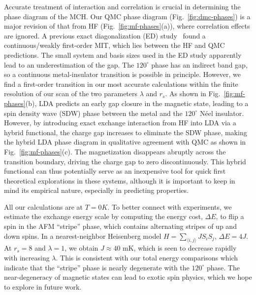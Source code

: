 \documentclass[aps,prb,showpacs,preprintnumbers,amsmath,amssymb,superscriptaddress,twocolumn]{revtex4-1}
\begin{document}
Accurate treatment of interaction and correlation is crucial in determining the phase diagram of the MCH.
Our QMC phase diagram (Fig.~\ref{fig:dmc-phases}) is a major revision of that from HF (Fig.~\ref{fig:mf-phases}(a)), where correlation effects are ignored.
A previous exact diagonalization (ED) study~\cite{Morales-Duran2021} found a continuous/weakly first-order MIT, which lies between the HF and QMC predictions.
The small system and basis sizes used in the ED study apparently lead to an underestimation of the gap.
The $120^\circ$ phase has an indirect band gap, so a continuous metal-insulator transition is possible in principle.
However, we find a first-order transition in our most accurate calculations within the finite resolution of
our scan of the two parameters $\lambda$ and $r_s$.
As shown in Fig.~\ref{fig:mf-phases}(b), LDA predicts an early gap closure in the magnetic state, leading to a spin density wave (SDW) phase between the metal and the $120^\circ$ N\'eel insulator.
However, by introducing exact exchange interaction from HF into LDA via a hybrid functional, the charge gap increases to eliminate the SDW phase, making the hybrid LDA phase diagram in qualitative agreement with QMC as shown in Fig.~\ref{fig:mf-phases}(c).
The magnetization disappears abruptly across the transition boundary, driving the charge gap to zero discontinuously.
This hybrid functional can thus potentially serve as an inexpensive
tool for quick first theoretical explorations in these systems,
although it is important to keep in mind its empirical nature,
especially in predicting properties.

All our calculations are at $T=0K$.
To better connect with experiments, we estimate the exchange energy scale by computing the energy cost, $\Delta E$,
to flip a spin in the AFM ``stripe'' phase, which contains alternating stripes of up and down spins.
In a nearest-neighbor Heisenberg model $H=\sum_{\langle i, j\rangle} J S_i S_j$, $\Delta E=4J$.
At $r_s=8$ and $\lambda=1$, we obtain $J \approx 40$ mK,
which is seen to decrease rapidly with increasing $\lambda$.
This is consistent with our total energy comparisons which indicate that the ``stripe'' phase is nearly degenerate with the $120^\circ$ phase.
The near-degeneracy of magnetic states can lead to exotic spin physics, which we hope to explore in future work.
\end{document}
